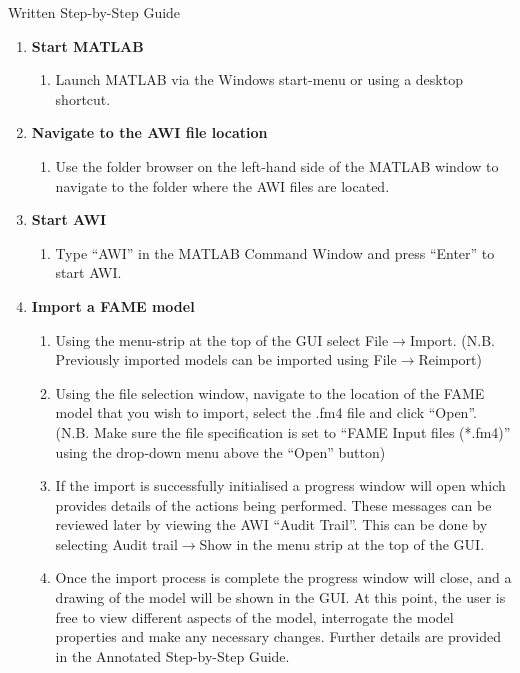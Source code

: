 Written Step-by-Step Guide
\begin{enumerate}
	\item \textbf{Start MATLAB}
	\begin{enumerate}
		\item Launch MATLAB via the Windows start-menu or using a desktop shortcut.
	\end{enumerate}
	\item \textbf{Navigate to the AWI file location}
	\begin{enumerate}
		\item Use the folder browser on the left-hand side of the MATLAB window to navigate to the folder where the AWI files are located. 
	\end{enumerate}
	\item \textbf{Start AWI} 
	\begin{enumerate}
		\item Type ``AWI'' in the MATLAB Command Window and press ``Enter'' to start AWI.
	\end{enumerate}
	\item \textbf{Import a FAME model} 
	\begin{enumerate}
		\item Using the menu-strip at the top of the GUI select File$\rightarrow$Import. (N.B. Previously imported models can be imported using File$\rightarrow$Reimport)
		\item Using the file selection window, navigate to the location of the FAME model that you wish to import, select the .fm4 file and click ``Open''. (N.B. Make sure the file specification is set to ``FAME Input files (*.fm4)'' using the drop-down menu above the ``Open'' button)
		\item If the import is successfully initialised a progress window will open which provides details of the actions being performed. These messages can be reviewed later by viewing the AWI ``Audit Trail''. This can be done by selecting Audit trail$\rightarrow$Show in the menu strip at the top of the GUI.
		\item Once the import process is complete the progress window will close, and a drawing of the model will be shown in the GUI. At this point, the user is free to view different aspects of the model, interrogate the model properties and make any necessary changes. Further details are provided in the Annotated Step-by-Step Guide.

\end{enumerate}
\end{enumerate}
